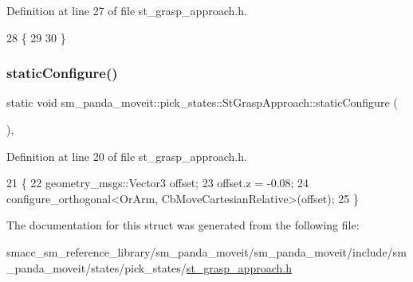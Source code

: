 Definition at line 27 of file st\+\_\+grasp\+\_\+approach.\+h.


\begin{DoxyCode}
28     \{
29       
30     \}
\end{DoxyCode}
\mbox{\label{structsm__panda__moveit_1_1pick__states_1_1StGraspApproach_add6c7e3c780c1ad8b75b72822c6412a8}} 
\subsubsection{\texorpdfstring{static\+Configure()}{staticConfigure()}}
{\footnotesize\ttfamily static void sm\+\_\+panda\+\_\+moveit\+::pick\+\_\+states\+::\+St\+Grasp\+Approach\+::static\+Configure (\begin{DoxyParamCaption}{ }\end{DoxyParamCaption})\hspace{0.3cm}{\ttfamily [inline]}, {\ttfamily [static]}}



Definition at line 20 of file st\+\_\+grasp\+\_\+approach.\+h.


\begin{DoxyCode}
21     \{
22         geometry\_msgs::Vector3 offset;
23         offset.z = -0.08;
24         configure\_orthogonal<OrArm, CbMoveCartesianRelative>(offset);
25     \}
\end{DoxyCode}


The documentation for this struct was generated from the following file\+:\begin{DoxyCompactItemize}
\item 
smacc\+\_\+sm\+\_\+reference\+\_\+library/sm\+\_\+panda\+\_\+moveit/sm\+\_\+panda\+\_\+moveit/include/sm\+\_\+panda\+\_\+moveit/states/pick\+\_\+states/\hyperlink{sm__panda__moveit_2sm__panda__moveit_2include_2sm__panda__moveit_2states_2pick__states_2st__grasp__approach_8h}{st\+\_\+grasp\+\_\+approach.\+h}\end{DoxyCompactItemize}
